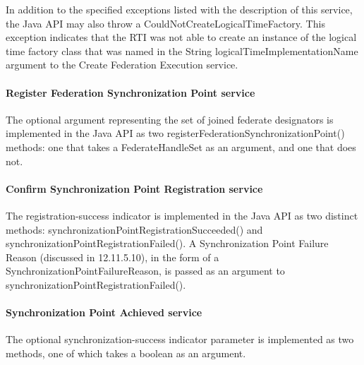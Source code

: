 \begin{compactstdpage}
    In addition to the specified exceptions listed with the description of this service, the Java API may also throw a CouldNotCreateLogicalTimeFactory. This exception indicates that the RTI was not able to create an instance of the logical time factory class that was named in the String logicalTimeImplementationName argument to the Create Federation Execution service.

    \paragraph{Register Federation Synchronization Point service}

    The optional argument representing the set of joined federate designators is implemented in the Java API as two registerFederationSynchronizationPoint() methods: one that takes a FederateHandleSet as an argument, and one that does not.

    \paragraph{Confirm Synchronization Point Registration \rtiinitiated{} service}

    The registration-success indicator is implemented in the Java API as two distinct methods: synchronizationPointRegistrationSucceeded()                and synchronizationPointRegistrationFailed(). A Synchronization Point Failure Reason (discussed in 12.11.5.10), in the form of a SynchronizationPointFailureReason, is passed as an argument to synchronizationPointRegistrationFailed().

    \paragraph{Synchronization Point Achieved service}

    The optional synchronization-success indicator parameter is implemented as two methods, one of which takes a boolean as an argument.

\end{compactstdpage}

\clearpage

